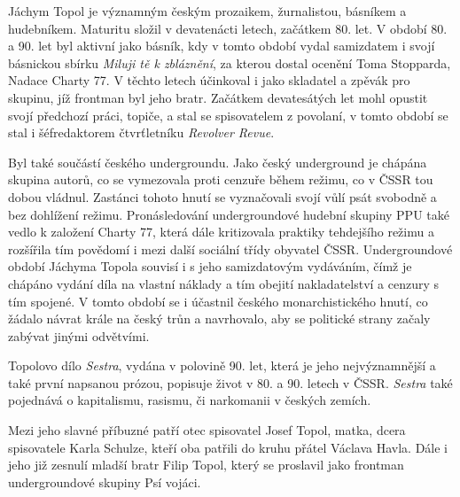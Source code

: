 \documentclass[11pt]{article}
\begin{document}
\setlength{\parindent}{2em}


Jáchym Topol je významným českým prozaikem, žurnalistou, básníkem a hudebníkem.
Maturitu složil v devatenácti letech, začátkem 80. let.
V období 80. a 90. let byl aktivní jako básník, kdy v tomto období vydal samizdatem i svojí básnickou sbírku \textit{Miluji tě k zbláznění}, za kterou dostal ocenění Toma Stopparda, Nadace Charty 77.
V těchto letech účinkoval i jako skladatel a zpěvák pro skupinu, jíž frontman byl jeho bratr.
Začátkem devatesátých let mohl opustit svojí předchozí práci, topiče, a stal se spisovatelem z povolaní, v tomto období se stal i šéfredaktorem čtvrťletníku \textit{Revolver Revue}. \par
Byl také součástí českého undergroundu.
Jako český underground je chápána skupina autorů, co se vymezovala proti cenzuře během režimu, co v ČSSR tou dobou vládnul.
Zastánci tohoto hnutí se vyznačovali svojí vůlí psát svobodně a bez dohlížení režimu.
Pronásledování undergroundové hudební skupiny PPU také vedlo k založení Charty 77, která dále kritizovala praktiky tehdejšího režimu a rozšířila tím povědomí i mezi další sociální třídy obyvatel ČSSR.
Undergroundové období Jáchyma Topola souvisí i s jeho samizdatovým vydáváním, čímž je chápáno vydání díla na vlastní náklady a tím obejití nakladatelství a cenzury s tím spojené.
V tomto období se i účastnil českého monarchistického hnutí, co žádalo návrat krále na český trůn a navrhovalo, aby se politické strany začaly zabývat jinými odvětvími. \par
Topolovo dílo \textit{Sestra}, vydána v polovině 90. let, která je jeho nejvýznamnější a také první napsanou prózou, popisuje život v 80. a 90. letech v ČSSR. \textit{Sestra} také pojednává o kapitalismu, rasismu, či narkomanii v českých zemích. \par
Mezi jeho slavné příbuzné patří otec spisovatel Josef Topol, matka, dcera spisovatele Karla Schulze, kteří oba patřili do kruhu přátel Václava Havla.
Dále i jeho již zesnulí mladší bratr Filip Topol, který se proslavil jako frontman undergroundové skupiny Psí vojáci.
\end{document}
